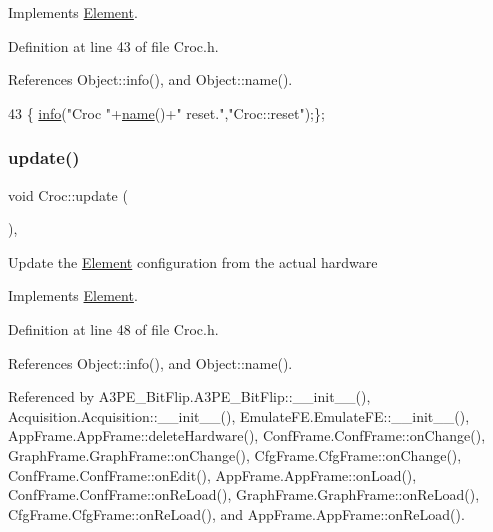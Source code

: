 Implements \hyperlink{classElement_a69efffa22f06909d768149715565cb56}{Element}.



Definition at line 43 of file Croc.\+h.



References Object\+::info(), and Object\+::name().


\begin{DoxyCode}
43 \{ \hyperlink{classObject_a644fd329ea4cb85f54fa6846484b84a8}{info}(\textcolor{stringliteral}{"Croc "}+\hyperlink{classObject_a300f4c05dd468c7bb8b3c968868443c1}{name}()+\textcolor{stringliteral}{" reset."},\textcolor{stringliteral}{"Croc::reset"});\};
\end{DoxyCode}
\mbox{\label{classCroc_a74b7f08ffdc15f8244af02c8cdccbc8f}} 
\subsubsection{\texorpdfstring{update()}{update()}}
{\footnotesize\ttfamily void Croc\+::update (\begin{DoxyParamCaption}{ }\end{DoxyParamCaption})\hspace{0.3cm}{\ttfamily [inline]}, {\ttfamily [virtual]}}

Update the \hyperlink{classElement}{Element} configuration from the actual hardware 

Implements \hyperlink{classElement_a4e6c83efae95616ebddd03c793a26661}{Element}.



Definition at line 48 of file Croc.\+h.



References Object\+::info(), and Object\+::name().



Referenced by A3\+P\+E\+\_\+\+Bit\+Flip.\+A3\+P\+E\+\_\+\+Bit\+Flip\+::\+\_\+\+\_\+init\+\_\+\+\_\+(), Acquisition.\+Acquisition\+::\+\_\+\+\_\+init\+\_\+\+\_\+(), Emulate\+F\+E.\+Emulate\+F\+E\+::\+\_\+\+\_\+init\+\_\+\+\_\+(), App\+Frame.\+App\+Frame\+::delete\+Hardware(), Conf\+Frame.\+Conf\+Frame\+::on\+Change(), Graph\+Frame.\+Graph\+Frame\+::on\+Change(), Cfg\+Frame.\+Cfg\+Frame\+::on\+Change(), Conf\+Frame.\+Conf\+Frame\+::on\+Edit(), App\+Frame.\+App\+Frame\+::on\+Load(), Conf\+Frame.\+Conf\+Frame\+::on\+Re\+Load(), Graph\+Frame.\+Graph\+Frame\+::on\+Re\+Load(), Cfg\+Frame.\+Cfg\+Frame\+::on\+Re\+Load(), and App\+Frame.\+App\+Frame\+::on\+Re\+Load().


